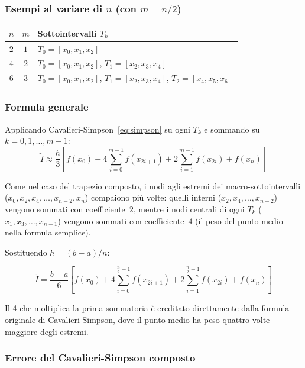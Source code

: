 \documentclass[a4paper,12pt]{article}
\theoremstyle{definition}
\theoremstyle{remark}
\begin{document}
\subsubsection*{Esempi al variare di $n$ (con $m = n/2$)}

\begin{center}
\begin{tabular}{ccl}
\toprule
$n$ & $m$ & Sottointervalli $T_k$ \\
\midrule
$2$ & $1$ & $T_0 = [x_0, x_1, x_2]$ \\
$4$ & $2$ & $T_0 = [x_0,x_1,x_2]$, \quad $T_1 = [x_2,x_3,x_4]$ \\
$6$ & $3$ & $T_0 = [x_0,x_1,x_2]$, \quad $T_1 = [x_2,x_3,x_4]$,
            \quad $T_2 = [x_4,x_5,x_6]$ \\
\bottomrule
\end{tabular}
\end{center}

\subsubsection*{Formula generale}

Applicando Cavalieri-Simpson~\eqref{eq:simpson} su ogni $T_k$ e
sommando su $k = 0, 1, \ldots, m-1$:
\[
  \tilde{I}
  \approx \frac{h}{3}\!\left[
    f(x_0)
    + 4\sum_{i=0}^{m-1} f(x_{2i+1})
    + 2\sum_{i=1}^{m-1} f(x_{2i})
    + f(x_n)
  \right]
\]

\noindent Come nel caso del trapezio composto, i nodi agli estremi dei
macro-sottointervalli ($x_0, x_2, x_4, \ldots, x_{n-2}, x_n$) compaiono
più volte: quelli interni ($x_2, x_4, \ldots, x_{n-2}$) vengono sommati
con coefficiente~$2$, mentre i nodi centrali di ogni $T_k$
($x_1, x_3, \ldots, x_{n-1}$) vengono sommati con coefficiente~$4$
(il peso del punto medio nella formula semplice).

Sostituendo $h = (b-a)/n$:

\begin{equation}
  \boxed{
    \tilde{I}
    = \frac{b-a}{6}\!\left[
      f(x_0)
      + 4\sum_{i=0}^{\frac{n}{2}-1} f(x_{2i+1})
      + 2\sum_{i=1}^{\frac{n}{2}-1} f(x_{2i})
      + f(x_n)
    \right]
  }
  \label{eq:simpson-comp}
\end{equation}

\noindent Il 4 che moltiplica la prima sommatoria è ereditato
direttamente dalla formula originale di Cavalieri-Simpson, dove il
punto medio ha peso quattro volte maggiore degli estremi.

\subsubsection*{Errore del Cavalieri-Simpson composto}
\end{document}
